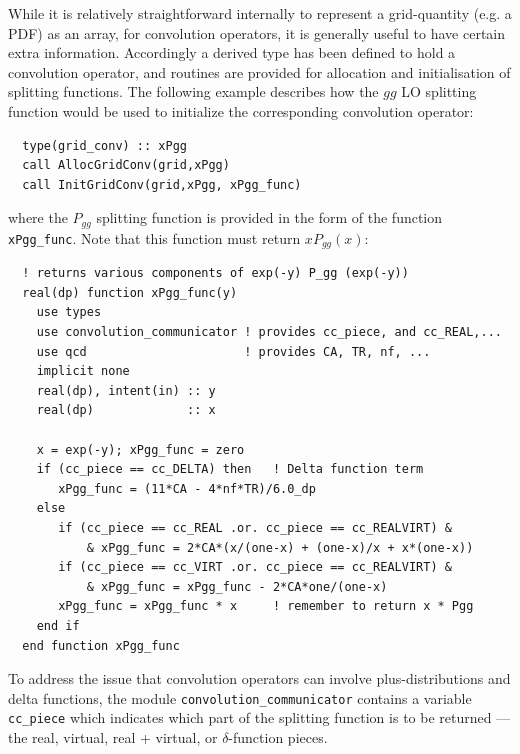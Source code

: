 \documentclass[12pt]{article}
\begin{document}
While it is relatively straightforward internally to represent a
grid-quantity (e.g. a PDF) as an array, for convolution
operators, it is generally useful to have certain extra
information. Accordingly a derived type has been defined to hold a
convolution operator, and routines are provided for allocation and
initialisation of splitting functions.
The following example describes how the $gg$ LO splitting function
would be used to initialize the corresponding 
convolution operator:
\begin{lstlisting}
  type(grid_conv) :: xPgg
  call AllocGridConv(grid,xPgg)
  call InitGridConv(grid,xPgg, xPgg_func)
\end{lstlisting}
where the $P_{gg}$ splitting function is provided in the form of the
function \texttt{xPgg\_func}. Note that this function
must return $xP_{gg}(x)$:
\begin{lstlisting}
  ! returns various components of exp(-y) P_gg (exp(-y))
  real(dp) function xPgg_func(y)
    use types
    use convolution_communicator ! provides cc_piece, and cc_REAL,...
    use qcd                      ! provides CA, TR, nf, ...
    implicit none
    real(dp), intent(in) :: y
    real(dp)             :: x

    x = exp(-y); xPgg_func = zero
    if (cc_piece == cc_DELTA) then   ! Delta function term
       xPgg_func = (11*CA - 4*nf*TR)/6.0_dp
    else
       if (cc_piece == cc_REAL .or. cc_piece == cc_REALVIRT) & 
           & xPgg_func = 2*CA*(x/(one-x) + (one-x)/x + x*(one-x))
       if (cc_piece == cc_VIRT .or. cc_piece == cc_REALVIRT) & 
           & xPgg_func = xPgg_func - 2*CA*one/(one-x)
       xPgg_func = xPgg_func * x     ! remember to return x * Pgg
    end if
  end function xPgg_func
\end{lstlisting}
To address the issue that convolution operators can involve
plus-distributions and delta functions, the module
\texttt{convolution\_communicator} contains a variable
\texttt{cc\_piece} which indicates which part of the splitting
function is to be returned --- the real, virtual, real + virtual, or
$\delta$-function pieces. 
\end{document}
